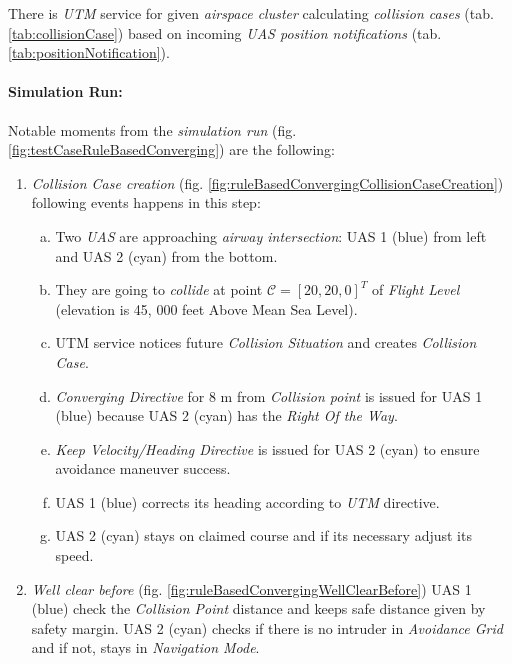 There is \emph{UTM} service for given \emph{airspace cluster} calculating \emph{collision cases} (tab. \ref{tab:collisionCase}) based on incoming \emph{UAS position notifications} (tab. \ref{tab:positionNotification}).

\paragraph{Simulation Run:} Notable moments from the \emph{simulation run} (fig. \ref{fig:testCaseRuleBasedConverging}) are the following:

\begin{enumerate}
    \item \emph{Collision Case creation} (fig. \ref{fig:ruleBasedConvergingCollisionCaseCreation}) following events happens in this step:
    \begin{enumerate}[a.]
        \item Two \emph{UAS} are approaching  \emph{airway intersection}: UAS 1 (blue) from left and UAS 2 (cyan) from the bottom.
        
        \item They are going to \emph{collide} at point $\mathscr{C}=[20,20,0]^T$ of \emph{Flight Level} (elevation is 45, 000 feet Above Mean Sea Level).
        
        \item UTM service notices future \emph{Collision Situation} and creates \emph{Collision Case}.
        
        \item \emph{Converging Directive} for 8 m from \emph{Collision point} is issued for UAS 1 (blue) because UAS 2 (cyan) has the \emph{Right Of the Way}.
        
        \item \emph{Keep Velocity/Heading Directive} is issued for UAS 2 (cyan) to ensure avoidance maneuver success.
        
        \item UAS 1 (blue) corrects its heading according to \emph{UTM} directive.
        
        \item UAS 2 (cyan) stays on claimed course and if its necessary adjust its speed.
        
    \end{enumerate}
    
    \item \emph{Well clear before} (fig. \ref{fig:ruleBasedConvergingWellClearBefore}) UAS 1 (blue) check the \emph{Collision Point} distance and keeps safe distance given by safety margin. UAS 2 (cyan) checks if there is no intruder in \emph{Avoidance Grid} and if not, stays in \emph{Navigation Mode}.
    

\end{enumerate}
